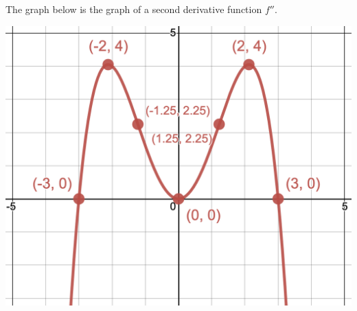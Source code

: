\documentclass{siproblemset}
\begin{document}
    \vspace{-1cm}
    \begin{multipartquestion}{The graph below is the graph of a second derivative function $f''$.}
        \begin{multicols}{2}
            \begin{center}
                \includegraphics[width=\linewidth]{img/pt3-graph1}
            \end{center}
            \vfill\null
            \columnbreak
            \ \newline
            \ \newline
            \ \newline
        \end{multicols}
    \end{multipartquestion}
    \newpage
    
\end{document}
